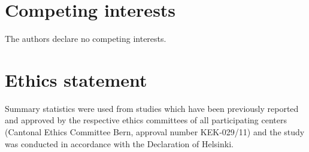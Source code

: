 \section{Competing interests}
The authors declare no competing interests.

\section{Ethics statement}
Summary statistics were used from studies which have been previously reported and approved by the respective ethics committees of all participating centers (Cantonal Ethics Committee Bern, approval number KEK-029/11) and the study was conducted in accordance with the Declaration of Helsinki.


 


